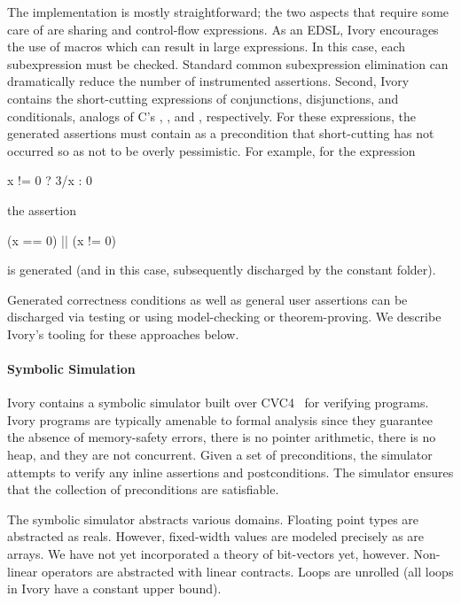 The implementation is mostly straightforward; the two aspects that require some
care of are sharing and control-flow expressions. As an EDSL, Ivory encourages
the use of macros which can result in large expressions. In this case, each
subexpression must be checked. Standard common subexpression elimination can
dramatically reduce the number of instrumented assertions. Second, Ivory contains
the short-cutting expressions of conjunctions, disjunctions, and conditionals,
analogs of C's \cd{\&\&}, \cd{||}, and , respectively. For these
expressions, the generated assertions must contain as a precondition that
short-cutting has not occurred so as not to be overly pessimistic. For example,
for the expression
\noindent
\begin{code}
x != 0 ? 3/x : 0
\end{code}
\noindent
the assertion
\begin{code}
(x == 0) || (x != 0)
\end{code}
\noindent
is generated (and in this case, subsequently discharged by the constant folder).

Generated correctness conditions as well as general user assertions can be
discharged via testing or using model-checking or theorem-proving. We describe
Ivory's tooling for these approaches below.

\paragraph{Symbolic Simulation}
Ivory contains a symbolic simulator built over CVC4~\cite{} for verifying
programs. Ivory programs are typically amenable to formal analysis since they
guarantee the absence of memory-safety errors, there is no pointer arithmetic,
there is no heap, and they are not concurrent. Given a set of preconditions, the
simulator attempts to verify any inline assertions and postconditions. The
simulator ensures that the collection of preconditions are satisfiable.

The symbolic simulator abstracts various domains. Floating point types are
abstracted as reals. However, fixed-width values are modeled precisely as are
arrays. We have not yet incorporated a theory of bit-vectors yet,
however.  Non-linear operators are abstracted with linear contracts. Loops are
unrolled (all loops in Ivory have a constant upper bound).

